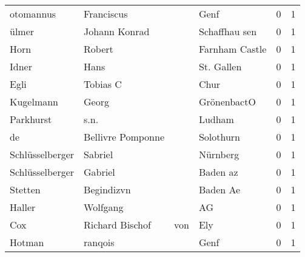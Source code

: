 \begin{tabular}{llllrr}
                otomannus &                         Franciscus &             &                                        Genf &          0 &         1 \\
                    ülmer &                      Johann Konrad &             &                               Schaffhau sen &          0 &         1 \\
                     Horn &                             Robert &             &                              Farnham Castle &          0 &         1 \\
                    Idner &                               Hans &             &                                  St. Gallen &          0 &         1 \\
                     Egli &                           Tobias C &             &                                        Chur &          0 &         1 \\
                Kugelmann &                              Georg &             &                                 GrönenbactO &          0 &         1 \\
                Parkhurst &                               s.n. &             &                                      Ludham &          0 &         1 \\
                       de &                  Bellivre Pomponne &             &                                   Solothurn &          0 &         1 \\
          Schlüsselberger &                            Sabriel &             &                                    Nürnberg &          0 &         1 \\
          Schlüsselberger &                            Gabriel &             &                                    Baden az &          0 &         1 \\
                  Stetten &                         Begindizvn &             &                                    Baden Ae &          0 &         1 \\
                   Haller &                           Wolfgang &             &                                          AG &          0 &         1 \\
                      Cox &                    Richard Bischof &         von &                                         Ely &          0 &         1 \\
                   Hotman &                            ranqois &             &                                        Genf &          0 &         1 \\

\end{tabular}
